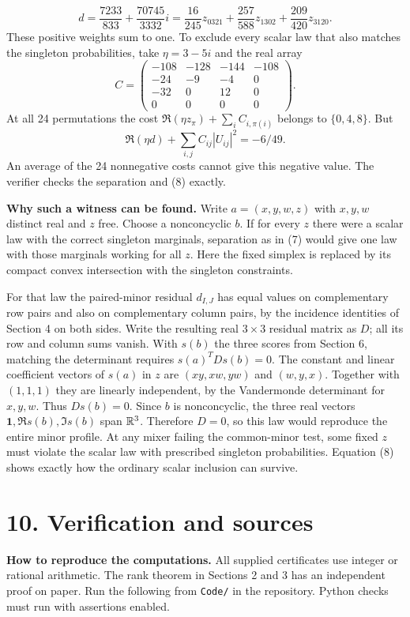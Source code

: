 \documentclass[11pt]{article}
\newcommand{\heading}[1]{\section*{\color{ink}#1}}
\begin{document}
\[
 d=\frac{7233}{833}+\frac{70745}{3332}i
   =\frac{16}{245}z_{0321}+\frac{257}{588}z_{1302}+\frac{209}{420}z_{3120}. \tag{8}
\]
These positive weights sum to one. To exclude every scalar law that also matches the singleton probabilities, take $\eta=3-5i$ and the real array
\[
 C=\begin{pmatrix}-108&-128&-144&-108\\-24&-9&-4&0\\-32&0&12&0\\0&0&0&0\end{pmatrix}.
\]
At all 24 permutations the cost $\Re(\eta z_\pi)+\sum_i C_{i,\pi(i)}$ belongs to $\{0,4,8\}$. But
\[
 \Re(\eta d)+\sum_{i,j}C_{ij}|U_{ij}|^2=-6/49.
\]
An average of the 24 nonnegative costs cannot give this negative value. The verifier checks the separation and (8) exactly.
\par\textbf{Why such a witness can be found.} Write $a=(x,y,w,z)$ with $x,y,w$ distinct real and $z$ free. Choose a nonconcyclic $b$. If for every $z$ there were a scalar law with the correct singleton marginals, separation as in (7) would give one law with those marginals working for all $z$. Here the fixed simplex is replaced by its compact convex intersection with the singleton constraints.
\par For that law the paired-minor residual $d_{I,J}$ has equal values on complementary row pairs and also on complementary column pairs, by the incidence identities of Section 4 on both sides. Write the resulting real $3\times3$ residual matrix as $D$; all its row and column sums vanish. With $s(b)$ the three scores from Section 6, matching the determinant requires $s(a)^TDs(b)=0$. The constant and linear coefficient vectors of $s(a)$ in $z$ are $(xy,xw,yw)$ and $(w,y,x)$. Together with $(1,1,1)$ they are linearly independent, by the Vandermonde determinant for $x,y,w$. Thus $Ds(b)=0$. Since $b$ is nonconcyclic, the three real vectors $\mathbf1,\Re s(b),\Im s(b)$ span $\mathbb R^3$. Therefore $D=0$, so this law would reproduce the entire minor profile. At any mixer failing the common-minor test, some fixed $z$ must violate the scalar law with prescribed singleton probabilities. Equation (8) shows exactly how the ordinary scalar inclusion can survive.
\newpage
\heading{10. Verification and sources}
\textbf{How to reproduce the computations.} All supplied certificates use integer or rational arithmetic. The rank theorem in Sections 2 and 3 has an independent proof on paper. Run the following from \texttt{Code/} in the repository. Python checks must run with assertions enabled.
\end{document}
